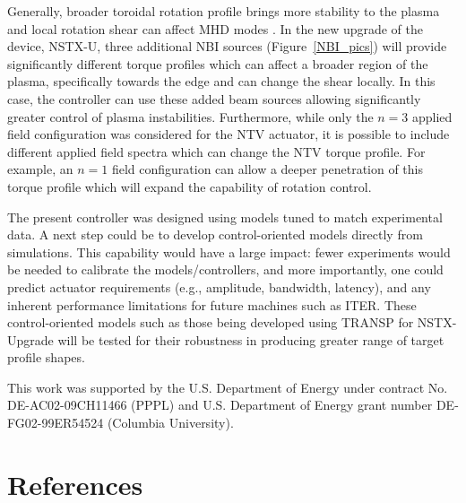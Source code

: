\documentclass{iopart}
\begin{document}
Generally, broader toroidal rotation profile brings more stability to the plasma \cite{Sabbagh10} and local rotation shear can affect MHD modes  \cite{Gerhardt09}. In the new upgrade of the device, NSTX-U, three additional NBI sources (Figure~{\ref{NBI_pics}}) will provide significantly different torque profiles which can affect a broader region of the plasma, specifically towards the edge and can change the shear locally. In this case, the controller can use these added beam sources allowing significantly greater control of plasma instabilities.
Furthermore, while only the $n = 3$ applied field configuration was considered for the NTV actuator, it is possible to include different applied field spectra which can change the NTV torque profile. For example, an $n=1$ field configuration can allow a deeper penetration of this torque profile which will expand the capability of rotation control.

The present controller was designed using models tuned to match experimental data. A next step could be to develop control-oriented models directly from simulations. This capability would have a large impact: fewer experiments would be needed to calibrate the models/controllers, and more importantly, one could predict actuator requirements (e.g., amplitude, bandwidth, latency), and any inherent performance limitations for future machines such as ITER.
These control-oriented models such as those being developed using TRANSP for NSTX-Upgrade will be tested for their robustness in producing greater range of target profile shapes. 

 
\ack 

This work was supported by the U.S. Department of Energy under contract No. DE-AC02-09CH11466 (PPPL) and U.S. Department of Energy  grant number DE-FG02-99ER54524 (Columbia University). 
\section*{References}



\end{document}
